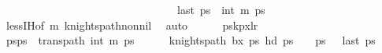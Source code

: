 \begin{isabellebody}
\ \ \ \ \ \ \ \ \ \ \ \ \ \ \ \ \ \ \ \ \ \ \ \ \ \ \ \ \ \ \ \ {\isachardoublequoteopen}last\ ps\ {\isacharequal}{\kern0pt}\ {\isacharparenleft}{\kern0pt}{}{\isacharcomma}{\kern0pt}int\ {\isacharparenleft}{\kern0pt}m{\isacharminus}{\kern0pt}{}{\isacharparenright}{\kern0pt}{\isacharminus}{\kern0pt}{}{\isacharparenright}{\kern0pt}{\isachardoublequoteclose}\ {\isachardoublequoteopen}ps\ {\isasymnoteq}\ {\isacharbrackleft}{\kern0pt}{\isacharbrackright}{\kern0pt}{\isachardoublequoteclose}\isanewline
\ \ \ \ \ \ \isamarkupfalse%
\ less{\isachardot}{\kern0pt}IH{\isacharbrackleft}{\kern0pt}of\ {\isachardoublequoteopen}m{\isacharminus}{\kern0pt}{}{\isachardoublequoteclose}{\isacharbrackright}{\kern0pt}\ knights{\isacharunderscore}{\kern0pt}path{\isacharunderscore}{\kern0pt}non{\isacharunderscore}{\kern0pt}nil\ \isamarkupfalse%
\ auto\isanewline
\isanewline
\ \ \ \ \isamarkupfalse%
\ {\isacharquery}{\kern0pt}pskp{}x{}lr{\isachardoublequoteclose}\isanewline
\ \ \ \ \isamarkupfalse%
\ {\isacharquery}{\kern0pt}psps\ {\isacharat}{\kern0pt}\ trans{\isacharunderscore}{\kern0pt}path\ {\isacharparenleft}{\kern0pt}{}{\isacharcomma}{\kern0pt}int\ {\isacharparenleft}{\kern0pt}m{\isacharminus}{\kern0pt}{}{\isacharparenright}{\kern0pt}{\isacharparenright}{\kern0pt}\ {\isacharquery}{\kern0pt}ps\isanewline
\ \ \ \ \isamarkupfalse%
\ {\isachardoublequoteopen}knights{\isacharunderscore}{\kern0pt}path\ b{}x{}\ {\isacharquery}{\kern0pt}ps\ {\isachardoublequoteopen}hd\ {\isacharquery}{\kern0pt}ps\ {\isacharequal}{\kern0pt}\ {\isacharparenleft}{\kern0pt}{}{\isacharcomma}{\kern0pt}\ {}{\isacharparenright}{\kern0pt}{\isachardoublequoteclose}\ {\isachardoublequoteopen}{\isacharquery}{\kern0pt}ps\ {\isasymnoteq}\ {\isacharbrackleft}{\kern0pt}{\isacharbrackright}{\kern0pt}{\isachardoublequoteclose}\ {\isachardoublequoteopen}last\ {\isacharquery}{\kern0pt}ps\ {\isacharequal}{\kern0pt}\ {\isacharparenleft}{\kern0pt}{}{\isacharcomma}{\kern0pt}{}{\isacharparenright}{\kern0pt}{\isachardoublequoteclose}\isanewline

\end{isabellebody}
